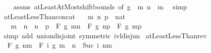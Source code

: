 \begin{isabellebody}
\ \ %
\endisadelimproof
%
\isatagproof
{}\isamarkupfalse%
\ assms\ atLeastAtMost{\isacharunderscore}{\kern0pt}shift{\isacharunderscore}{\kern0pt}bounds\ {\isacharbrackleft}{\kern0pt}of\ g\ {}\ m\ {\isachardoublequoteopen}n\ {\isacharminus}{\kern0pt}\ m{\isachardoublequoteclose}{\isacharbrackright}{\kern0pt}\ \isamarkupfalse%
\ simp%
\endisatagproof
{\isafoldproof}%
%
\isadelimproof
\isanewline
%
\endisadelimproof
\isanewline
{}\isamarkupfalse%
\ atLeastLessThan{\isacharunderscore}{\kern0pt}concat{\isacharcolon}{\kern0pt}\isanewline
\ \ \ m\ n\ p\ {\isacharcolon}{\kern0pt}{\isacharcolon}{\kern0pt}\ nat\isanewline
\ \ \ {\isachardoublequoteopen}m\ {\isasymle}\ n\ {\isasymLongrightarrow}\ n\ {\isasymle}\ p\ {\isasymLongrightarrow}\ F\ g\ {\isacharbraceleft}{\kern0pt}m{\isachardot}{\kern0pt}{\isachardot}{\kern0pt}{\isacharless}{\kern0pt}n{\isacharbraceright}{\kern0pt}\ \isactrlbold {\isacharasterisk}{\kern0pt}\ F\ g\ {\isacharbraceleft}{\kern0pt}n{\isachardot}{\kern0pt}{\isachardot}{\kern0pt}{\isacharless}{\kern0pt}p{\isacharbraceright}{\kern0pt}\ {\isacharequal}{\kern0pt}\ F\ g\ {\isacharbraceleft}{\kern0pt}m{\isachardot}{\kern0pt}{\isachardot}{\kern0pt}{\isacharless}{\kern0pt}p{\isacharbraceright}{\kern0pt}{\isachardoublequoteclose}\isanewline
%
\isadelimproof
\ \ %
\endisadelimproof
%
\isatagproof
{}\isamarkupfalse%
\ {\isacharparenleft}{\kern0pt}simp\ add{\isacharcolon}{\kern0pt}\ union{\isacharunderscore}{\kern0pt}disjoint\ {\isacharbrackleft}{\kern0pt}symmetric{\isacharbrackright}{\kern0pt}\ ivl{\isacharunderscore}{\kern0pt}disj{\isacharunderscore}{\kern0pt}un{\isacharparenright}{\kern0pt}%
\endisatagproof
{\isafoldproof}%
%
\isadelimproof
\isanewline
%
\endisadelimproof
\isanewline
{}\isamarkupfalse%
\ atLeastLessThan{\isacharunderscore}{\kern0pt}rev{\isacharcolon}{\kern0pt}\isanewline
\ \ {\isachardoublequoteopen}F\ g\ {\isacharbraceleft}{\kern0pt}n{\isachardot}{\kern0pt}{\isachardot}{\kern0pt}{\isacharless}{\kern0pt}m{\isacharbraceright}{\kern0pt}\ {\isacharequal}{\kern0pt}\ F\ {\isacharparenleft}{\kern0pt}{\isasymlambda}i{\isachardot}{\kern0pt}\ g\ {\isacharparenleft}{\kern0pt}m\ {\isacharplus}{\kern0pt}\ n\ {\isacharminus}{\kern0pt}\ Suc\ i{\isacharparenright}{\kern0pt}{\isacharparenright}{\kern0pt}\ {\isacharbraceleft}{\kern0pt}n{\isachardot}{\kern0pt}{\isachardot}{\kern0pt}{\isacharless}{\kern0pt}m{\isacharbraceright}{\kern0pt}{\isachardoublequoteclose}\isanewline
%
\isadelimproof
\ \ %
\endisadelimproof
%
\isatagproof
{}\isamarkupfalse%

\end{isabellebody}

